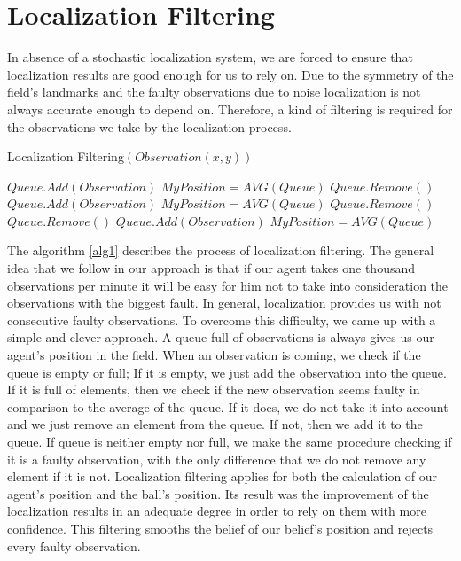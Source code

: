\section{Localization Filtering}
In absence of a stochastic localization system, we are forced to ensure that localization results are good enough for us to rely on. Due to the symmetry of the field's landmarks and the faulty observations due to noise localization is not always accurate enough to depend on. Therefore, a kind of filtering is required for the observations we take by the localization process.
\begin{algorithm}[htb!]
\caption{Localization Filtering$(Observation(x,y))$}
\label{alg1}
\begin{algorithmic}[1]
\STATE $Queue.Add(Observation)$
\STATE $MyPosition = AVG(Queue)$
\STATE $Queue.Remove()$
\ELSE
\STATE $Queue.Add(Observation)$
\STATE $MyPosition = AVG(Queue)$
\ENDIF
\ELSE
{}
\STATE $Queue.Remove()$
\ELSE
\STATE $Queue.Remove()$
\STATE $Queue.Add(Observation)$
\STATE $MyPosition = AVG(Queue)$
\ENDIF
\ENDIF
\ENDIF
\end{algorithmic}
\end{algorithm}
The algorithm \ref{alg1} describes the process of localization filtering. The general idea that we follow in our approach is that if our agent takes one thousand observations per minute it will be easy for him not to take into consideration the observations with the biggest fault. In general, localization provides us with not consecutive faulty observations. To overcome this difficulty, we came up with a simple and clever approach. A queue full of observations is always gives us our agent's position in the field. When an observation is coming, we check if the queue is empty or full; If it is empty, we just add the observation into the queue. If it is full of elements, then we check if the new observation seems faulty in comparison to the average of the queue. If it does, we do not take it into account and we just remove an element from the queue. If not, then we add it to the queue.
If queue is neither empty nor full, we make the same procedure checking if it is a faulty observation, with the only difference that we do not remove any element if it is not. Localization filtering applies for both the calculation of our agent's position and the ball's position. Its result was the improvement of the localization results in an adequate degree in order to rely on them with more confidence. This filtering smooths the belief of our belief's position and rejects every faulty observation.







